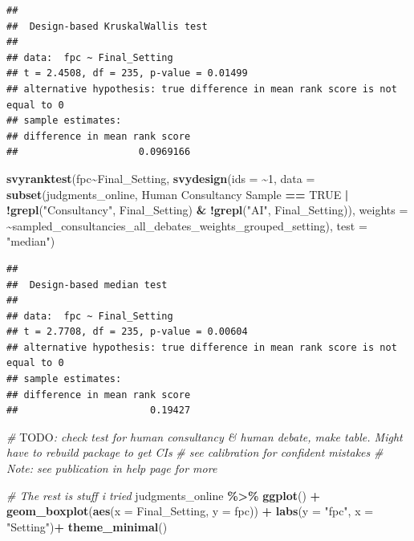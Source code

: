 \documentclass[
]{article}
\newenvironment{Shaded}{\begin{snugshade}}{\end{snugshade}}
\newcommand{\AlertTok}[1]{\textcolor[rgb]{0.94,0.16,0.16}{#1}}
\newcommand{\AttributeTok}[1]{\textcolor[rgb]{0.13,0.29,0.53}{#1}}
\newcommand{\CommentTok}[1]{\textcolor[rgb]{0.56,0.35,0.01}{\textit{#1}}}
\newcommand{\ConstantTok}[1]{\textcolor[rgb]{0.56,0.35,0.01}{#1}}
\newcommand{\DecValTok}[1]{\textcolor[rgb]{0.00,0.00,0.81}{#1}}
\newcommand{\FunctionTok}[1]{\textcolor[rgb]{0.13,0.29,0.53}{\textbf{#1}}}
\newcommand{\NormalTok}[1]{#1}
\newcommand{\SpecialCharTok}[1]{\textcolor[rgb]{0.81,0.36,0.00}{\textbf{#1}}}
\newcommand{\StringTok}[1]{\textcolor[rgb]{0.31,0.60,0.02}{#1}}
\begin{document}
\begin{verbatim}
## 
##  Design-based KruskalWallis test
## 
## data:  fpc ~ Final_Setting
## t = 2.4508, df = 235, p-value = 0.01499
## alternative hypothesis: true difference in mean rank score is not equal to 0
## sample estimates:
## difference in mean rank score 
##                     0.0969166
\end{verbatim}

\begin{Shaded}
\begin{Highlighting}[]
\FunctionTok{svyranktest}\NormalTok{(fpc}\SpecialCharTok{\textasciitilde{}}\NormalTok{Final\_Setting, }
            \FunctionTok{svydesign}\NormalTok{(}\AttributeTok{ids =} \SpecialCharTok{\textasciitilde{}}\DecValTok{1}\NormalTok{, }\AttributeTok{data =} \FunctionTok{subset}\NormalTok{(judgments\_online, }\StringTok{\textasciigrave{}}\AttributeTok{Human Consultancy Sample}\StringTok{\textasciigrave{}} \SpecialCharTok{==} \ConstantTok{TRUE} \SpecialCharTok{|} \SpecialCharTok{!}\FunctionTok{grepl}\NormalTok{(}\StringTok{"Consultancy"}\NormalTok{, Final\_Setting) }\SpecialCharTok{\&} \SpecialCharTok{!}\FunctionTok{grepl}\NormalTok{(}\StringTok{"AI"}\NormalTok{, Final\_Setting)), }\AttributeTok{weights =} \SpecialCharTok{\textasciitilde{}}\NormalTok{sampled\_consultancies\_all\_debates\_weights\_grouped\_setting),}
            \AttributeTok{test =} \StringTok{"median"}\NormalTok{)}
\end{Highlighting}
\end{Shaded}

\begin{verbatim}
## 
##  Design-based median test
## 
## data:  fpc ~ Final_Setting
## t = 2.7708, df = 235, p-value = 0.00604
## alternative hypothesis: true difference in mean rank score is not equal to 0
## sample estimates:
## difference in mean rank score 
##                       0.19427
\end{verbatim}

\begin{Shaded}
\begin{Highlighting}[]
\CommentTok{\# }\AlertTok{TODO}\CommentTok{: check test for human consultancy \& human debate, make table. Might have to rebuild package to get CIs}
\CommentTok{\# see calibration for confident mistakes}
\CommentTok{\# Note: see publication in help page for more}



\CommentTok{\# The rest is stuff i tried}
\NormalTok{judgments\_online }\SpecialCharTok{\%\textgreater{}\%}
  \FunctionTok{ggplot}\NormalTok{() }\SpecialCharTok{+}
  \FunctionTok{geom\_boxplot}\NormalTok{(}\FunctionTok{aes}\NormalTok{(}\AttributeTok{x =}\NormalTok{ Final\_Setting, }\AttributeTok{y =}\NormalTok{ fpc)) }\SpecialCharTok{+}
  \FunctionTok{labs}\NormalTok{(}\AttributeTok{y =} \StringTok{"fpc"}\NormalTok{, }\AttributeTok{x =} \StringTok{"Setting"}\NormalTok{)}\SpecialCharTok{+}
  \FunctionTok{theme\_minimal}\NormalTok{()}
\end{Highlighting}
\end{Shaded}
\end{document}
